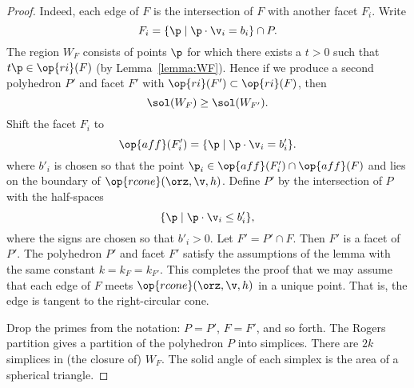 %

\begin{proof} 
  Indeed,
each edge of $F$ is the intersection of $F$ with another facet
$F_i$.  Write
\begin{displaymath}
F_i = \{\p \mid \p \cdot \v_i = b_i\} \cap P.
\end{displaymath}
The region $W_F$ consists of points $\p$ for which there exists a
$t>0$ such that $t\p \in\op{ri}(F)$ (by Lemma~\ref{lemma:WF}).  Hence
if we produce a second polyhedron $P'$ and facet $F'$ with
$\op{ri}(F')\subset \op{ri}(F)$, then
\begin{displaymath}
\sol(W_F)\ge \sol(W_{F'}).
\end{displaymath}
Shift the facet $F_i$ to
\begin{displaymath}
\op{aff}(F'_i) = \{\p \mid \p \cdot \v_i = b'_i\}.
\end{displaymath}
where $b'_i$ is chosen so that the point $\p_i\in \op{aff}(F'_i)\cap
\op{aff}(F)$ and lies on the boundary of $\op{rcone}(\orz,\v,h)$.
Define $P'$ by the intersection of $P$ with the half-spaces
\begin{displaymath}
\{\p \mid \p \cdot \v_i \le b'_i\},
\end{displaymath}
where the signs are chosen so that $b'_i>0$.  Let $F' = P'\cap F$.
Then $F'$ is a facet of $P'$.  The polyhedron $P'$ and facet $F'$
satisfy the assumptions of the lemma with the same constant $k= k_F =
k_{F'}$.  This completes the proof that we may assume that each edge
of $F$ meets $\op{rcone}(\orz,\v,h)$ in a unique point.  That is, the
edge is tangent to the right-circular cone.

Drop the primes from the notation: $P=P'$, $F=F'$, and so forth.  The
Rogers partition gives a partition of the polyhedron $P$ into
simplices.  There are $2k$ simplices in (the closure of) $W_F$.  The
solid angle of each simplex is the area of a spherical triangle.


\end{proof}
